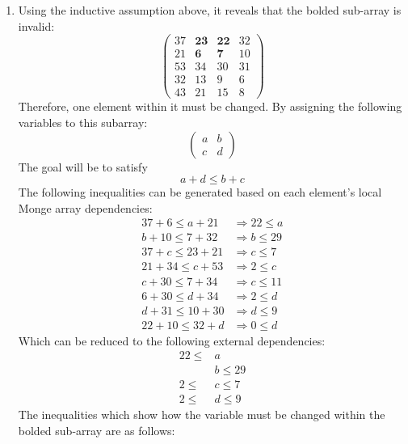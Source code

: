 \documentclass{article}
\begin{document}
\begin{enumerate}
\begin{enumerate}
        \item Using the inductive assumption above, it reveals that the bolded sub-array is invalid: 
        \[
        \left(
        \begin{array}{cccc}
        37 & \textbf{23} & \textbf{22} & 32 \\
        21 & \textbf{6} & \textbf{7} & 10 \\
        53 & 34 & 30 & 31 \\
        32 & 13 & 9 & 6 \\
        43 & 21 & 15 & 8 \end{array}
        \right)\]
        Therefore, one element within it must be changed. By assigning the following variables to this subarray:
        \[
        \left(
        \begin{array}{cc}
        a & b \\
        c & d \end{array}
        \right)\]
        The goal will be to satisfy
        $$a + d \leq b + c$$
        The following inequalities can be generated based on each element's local Monge array dependencies:
        \begin{align*}
            37 + 6 \leq a + 21 &\Rightarrow 22 \leq a \\
            b + 10 \leq 7 + 32 &\Rightarrow b \leq 29 \\
            37 + c \leq 23 + 21 &\Rightarrow c \leq 7 \\
            21 + 34 \leq c + 53 &\Rightarrow 2 \leq c \\
            c + 30 \leq 7 + 34 &\Rightarrow c \leq 11 \\
            6 + 30 \leq d + 34 &\Rightarrow 2 \leq d \\
            d + 31 \leq 10 + 30 &\Rightarrow d \leq 9 \\
            22 + 10 \leq 32 + d &\Rightarrow 0 \leq d 
        \end{align*}
        Which can be reduced to the following external dependencies:
        \begin{align*}
            22 \leq &a \\
            &b \leq 29 \\
            2 \leq &c \leq 7 \\
            2 \leq &d \leq 9
        \end{align*}
        The inequalities which show how the variable must be changed within the bolded sub-array are as follows:
        \begin{align*}

\end{align*}
\end{enumerate}
\end{enumerate}
\end{document}
